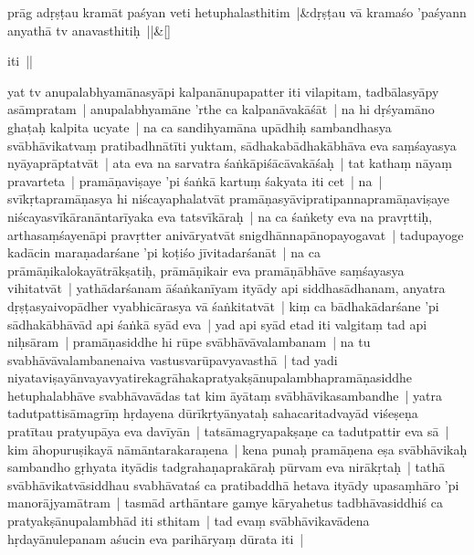 \documentclass[article,12pt,a4paper]{memoir}%
\newcounter{parCount}
\begin{document}
	{}
	\pend%
      
	    
	    \stanza[\smallbreak]
	  prāg adṛṣṭau kramāt paśyan veti hetuphalasthitim |&dṛṣṭau vā kramaśo 'paśyann anyathā tv anavasthitiḥ ||\&[\smallbreak]
	  
	  
	  

	  
	  \pstart \leavevmode%
	iti ||
	{}
	\pend%
      

	  
	  \pstart \leavevmode%
	\label{thakur75-111.4}yat tv anupalabhyamānasyāpi kalpanānupapatter iti vilapitam, tadbālasyāpy asāmpratam | anupalabhyamāne 'rthe ca kalpanāvakāśāt | na hi dṛśyamāno ghaṭaḥ kalpita ucyate | na ca sandihyamāna upādhiḥ sambandhasya svābhāvikatvaṃ pratibadhnātīti yuktam, sādhakabādhakābhāva eva saṃśayasya nyāyaprāptatvāt | ata eva na sarvatra śaṅkāpiśācāvakāśaḥ | tat kathaṃ nāyaṃ pravarteta | \label{thakur75-111.9} pramāṇaviṣaye 'pi śaṅkā kartuṃ śakyata iti cet | na | svīkṛtapramāṇasya hi niścayaphalatvāt pramāṇasyāvipratipannapramāṇaviṣaye niścayasvīkāranāntarīyaka eva tatsvīkāraḥ | na ca śaṅkety eva na pravṛttiḥ, arthasaṃśayenāpi pravṛtter anivāryatvāt snigdhānnapānopayogavat | tadupayoge kadācin maraṇadarśane 'pi koṭiśo jīvitadarśanāt | na ca prāmāṇikalokayātrākṣatiḥ, prāmāṇikair eva pramāṇābhāve saṃśayasya vihitatvāt | yathādarśanam āśaṅkanīyam ityādy api siddhasādhanam, anyatra dṛṣṭasyaivopādher vyabhicārasya vā śaṅkitatvāt | kiṃ ca bādhakādarśane 'pi sādhakābhāvād api śaṅkā syād eva | \label{thakur75-111.17} yad api syād etad iti valgitaṃ tad api niḥsāram | pramāṇasiddhe hi rūpe svābhāvāvalambanam | na tu svabhāvāvalambanenaiva vastusvarūpavyavasthā | tad yadi niyataviṣayānvayavyatirekagrāhakapratyakṣānupalambhapramāṇasiddhe hetuphalabhāve svabhāvavādas tat kim āyātaṃ svābhāvikasambandhe | yatra tadutpattisāmagrīṃ hṛdayena dūrīkṛtyānyataḥ sahacaritadvayād viśeṣeṇa pratītau pratyupāya eva davīyān | tatsāmagryapakṣaṇe ca tadutpattir eva sā | kim āhopuruṣikayā nāmāntarakaraṇena | kena punaḥ pramāṇena eṣa svābhāvikaḥ sambandho gṛhyata ityādis tadgrahaṇaprakāraḥ pūrvam eva nirākṛtaḥ | tathā svābhāvikatvāsiddhau svabhāvataś ca pratibaddhā hetava ityādy upasaṃhāro 'pi manorājyamātram | tasmād arthāntare gamye kāryahetus tadbhāvasiddhiś ca pratyakṣānupalambhād iti sthitam | tad evaṃ svābhāvikavādena hṛdayānulepanam aśucin eva parihāryaṃ dūrata iti |
	{}
	\pend%
      
\end{document}

